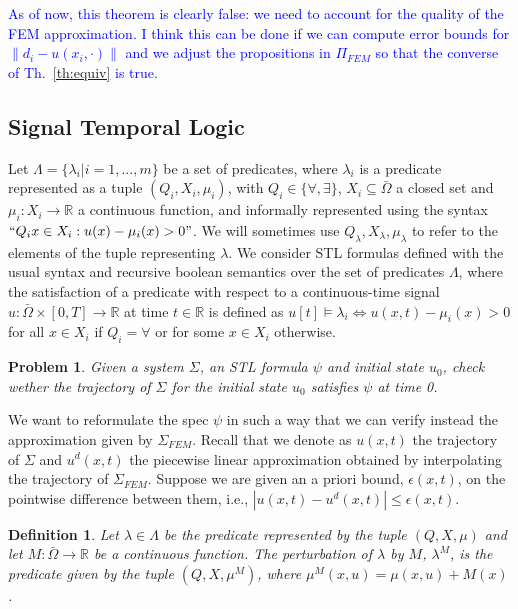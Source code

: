 \documentclass{article}
\newtheorem{definition}{Definition}
\newtheorem{problem}{Problem}
\newcommand*{\R}{\mathbb{R}}
\newcommand*{\fran}[1]{\textcolor{blue}{#1}}
\begin{document}
\fran{As of now, this theorem is clearly false: we need to account for the
quality of the FEM approximation. I think this can be done if 
we can compute error bounds for $\|d_i - u(x_i, \cdot)\|$ and we adjust the
propositions in $\Pi_{FEM}$ so that the converse of Th.~\ref{th:equiv} is true.}

\fi

\subsection{Signal Temporal Logic}
\label{sub:signal_temporal_logic}

Let $\Lambda = \{\lambda_i | i = 1,...,m\}$ be a set of predicates, where
$\lambda_i$ is a predicate represented as a tuple $(Q_i, X_i, \mu_i)$, with $Q_i
\in \{\forall, \exists\}$, $X_i
\subseteq \bar\Omega$ a closed set and $\mu_i : X_i \to \R$ a continuous function,
and informally represented using the syntax $``Q_i x \in X_i : u(x) - \mu_i(x) >
0"$. We will sometimes use $Q_\lambda, X_\lambda, \mu_\lambda$ to refer to the
elements of the tuple representing $\lambda$. We consider STL formulas 
defined with the usual syntax and recursive boolean
semantics over the set of predicates $\Lambda$, where the satisfaction of a
predicate with respect to a continuous-time signal $u : \bar\Omega \times [0, T]
\to \R$ at time $t \in \R$ is defined as $u[t] \models \lambda_i \iff 
  u(x, t) - \mu_i(x) > 0$ for all $x \in X_i$ if $Q_i = \forall$ or for some $x \in
X_i$ otherwise.

\begin{problem}
\label{pr:stl}
    Given a system $\Sigma$, an STL formula $\psi$ and initial state $u_0$,
    check wether the trajectory of $\Sigma$ for the initial state $u_0$
    satisfies $\psi$ at time 0.
\end{problem}

We want to reformulate the spec $\psi$ in such a way that we can verify instead the
approximation given by $\Sigma_{FEM}$. Recall that we denote as $u(x,t)$ the
trajectory of $\Sigma$ and $u^d(x, t)$ the piecewise linear approximation
obtained by interpolating the trajectory of $\Sigma_{FEM}$. Suppose we are given
an a priori bound, $\epsilon(x, t)$, on the pointwise difference between them, i.e., 
$|u(x, t) - u^d(x, t)| \leq \epsilon(x, t)$.

\begin{definition}
\label{def:m_perturbation}
    Let $\lambda \in \Lambda$ be the predicate represented by the tuple $(Q, X,
    \mu)$ and let $M : \bar\Omega \to \R$ be a continuous function. The perturbation of
    $\lambda$ by $M$, $\lambda^M$, is the predicate given by the tuple $(Q, X,
    \mu^M)$, where $\mu^M(x, u) = \mu(x, u) + M(x)$.
\end{definition}
\end{document}
